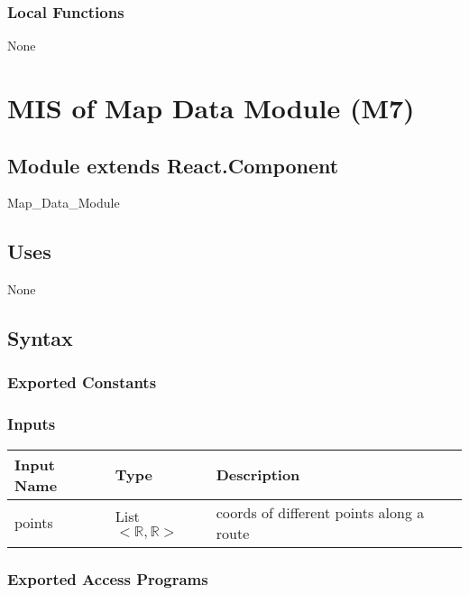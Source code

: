 \documentclass[12pt, titlepage]{article}
\begin{document}
\subsubsection{Local Functions}

None



\section{MIS of Map Data Module (M7)} 

\label{Module} 

\subsection{Module extends React.Component}

Map\_Data\_Module

\subsection{Uses}

None

\subsection{Syntax}

\subsubsection{Exported Constants}

\subsubsection{Inputs}
\begin{tabular}{| l | l | l |}
  \hline
  \textbf{Input Name} & \textbf{Type} & \textbf{Description}\\
  \hline
  points & List$<\mathbb{R},\mathbb{R}>$  & coords of different points along a route \\
  \hline
\end{tabular}

\subsubsection{Exported Access Programs}
\end{document}
